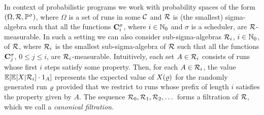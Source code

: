 \begin{remark}
\label{rem:canfilt}
In context of probabilistic programs we work with probability 
spaces of the form $(\Omega,\mathcal{R},\mathbb{P}^\sigma)$, where $\Omega$ is a 
set of runs in some $\mathcal{C}$ and $\mathcal{R}$ is (the smallest) sigma-algebra 
such that all the functions $\mathbf{C}^{\sigma}_{i}$, where $i\in \mathbb{N}_0$ and 
$\sigma$ is a scheduler, are $\mathcal{R}$-measurable. In such a setting we can 
also consider sub-sigma-algebras $\mathcal{R}_i$, $i\in \mathbb{N}_0$, of 
$\mathcal{R}$, where $\mathcal{R}_i$ is the smallest sub-sigma-algebra of 
$\mathcal{R}$ such that all the functions $\mathbf{C}^{\sigma}_{j}$, $0\leq j \leq 
i$, are $\mathcal{R}_i$-measurable. 
Intuitively, each set $A\in\mathcal{R}_i$ consists of runs whose first $i$ steps 
satisfy some property.
Then, for each $A\in \mathcal{R}_i$, the 
value $\mathbb{E}[\mathbb{E}[X|\mathcal{R}_i]\cdot 1_A]$ represents the expected value of 
$X(\varrho)$ for the randomly generated run $\varrho$ provided that we restrict to 
runs whose
prefix of length $i$ satisfies the property given by $A$. 
The sequence $\mathcal{R}_0,\mathcal{R}_1,\mathcal{R}_2,\dots$ forms a 
filtration of $\mathcal{R}$, which we call a \emph{canonical filtration}.
\end{remark}


